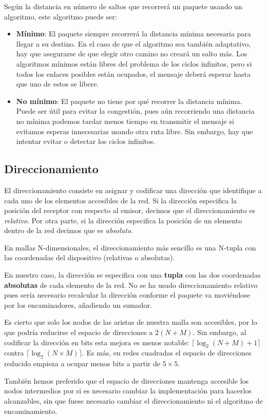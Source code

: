 Según la distancia en número de saltos que recorrerá un paquete usando un algoritmo, este algoritmo puede ser:
\begin{itemize}
    \item \textbf{Mínimo}: El paquete siempre recorrerá la distancia mínima necesaria para llegar a su destino. En el caso de que el algoritmo sea también adaptativo, hay que asegurarse de que elegir otro camino no creará un salto más. Los algoritmos mínimos están libres del problema de los ciclos infinitos, pero si todos los enlaces posibles están ocupados, el mensaje deberá esperar hasta que uno de estos se libere.
    \item \textbf{No mínimo}: El paquete no tiene por qué recorrer la distancia mínima. Puede ser útil para evitar la congestión, pues aún recorriendo una distancia no mínima podemos tardar menos tiempo en transmitir el mensaje si evitamos esperas innecesarias usando otra ruta libre. Sin embargo, hay que intentar evitar o detectar los ciclos infinitos.
\end{itemize}

\subsection{Direccionamiento}

El direccionamiento consiste en asignar y codificar una dirección que identifique a cada uno de los elementos accesibles de la red. Si la dirección especifica la posición del receptor con respecto al emisor, decimos que el direccionamiento es \textit{relativo}. Por otra parte, si la dirección especifica la posición de un elemento dentro de la red decimos que es \textit{absoluto}.

En mallas N-dimensionales, el direccionamiento más sencillo es una N-tupla con las coordenadas del dispositivo (relativas o absolutas).

\begin{recuadronoc}
    En nuestro caso, la dirección se especifica con una \textbf{tupla} con las dos coordenadas \textbf{absolutas} de cada elemento de la red. No se ha usado direccionamiento relativo pues sería necesario recalcular la dirección conforme el paquete va moviéndose por los encaminadores, añadiendo un sumador.

    Es cierto que solo los nodos de las aristas de nuestra malla son accesibles, por lo que podría reducirse el espacio de direcciones a $2(N+M)$. Sin embargo, al codificar la dirección en bits esta mejora es menos notable: $\lceil \log_2 (N+M) + 1\rceil$ contra $\lceil \log_2 (N\times M)\rceil$. Es más, en redes cuadradas el espacio de direcciones reducido empieza a ocupar menos bits a partir de $5\times5$.
    
    También hemos preferido que el espacio de direcciones mantenga accesible los nodos intermedios por si es necesario cambiar la implementación para hacerlos alcanzables, sin que fuese necesario cambiar el direccionamiento ni el algoritmo de encaminamiento.
\end{recuadronoc}

